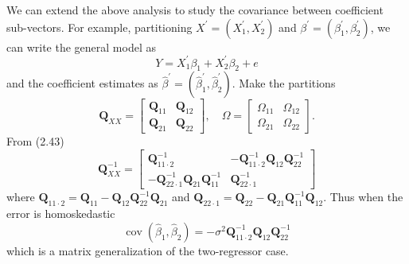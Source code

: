 \documentclass[10pt]{article}
\begin{document}
We can extend the above analysis to study the covariance between coefficient sub-vectors. For example, partitioning $X^{\prime}=\left(X_{1}^{\prime}, X_{2}^{\prime}\right)$ and $\beta^{\prime}=\left(\beta_{1}^{\prime}, \beta_{2}^{\prime}\right)$, we can write the general model as
$$
Y=X_{1}^{\prime} \beta_{1}+X_{2}^{\prime} \beta_{2}+e
$$
and the coefficient estimates as $\widehat{\beta}^{\prime}=\left(\widehat{\beta}_{1}^{\prime}, \widehat{\beta}_{2}^{\prime}\right)$. Make the partitions
$$
\boldsymbol{Q}_{X X}=\left[\begin{array}{ll}
\boldsymbol{Q}_{11} & \boldsymbol{Q}_{12} \\
\boldsymbol{Q}_{21} & \boldsymbol{Q}_{22}
\end{array}\right], \quad \Omega=\left[\begin{array}{ll}
\Omega_{11} & \Omega_{12} \\
\Omega_{21} & \Omega_{22}
\end{array}\right] .
$$
From (2.43)
$$
\boldsymbol{Q}_{X X}^{-1}=\left[\begin{array}{cc}
\boldsymbol{Q}_{11 \cdot 2}^{-1} & -\boldsymbol{Q}_{11 \cdot 2}^{-1} \boldsymbol{Q}_{12} \boldsymbol{Q}_{22}^{-1} \\
-\boldsymbol{Q}_{22 \cdot 1}^{-1} \boldsymbol{Q}_{21} \boldsymbol{Q}_{11}^{-1} & \boldsymbol{Q}_{22 \cdot 1}^{-1}
\end{array}\right]
$$
where $\boldsymbol{Q}_{11 \cdot 2}=\boldsymbol{Q}_{11}-\boldsymbol{Q}_{12} \boldsymbol{Q}_{22}^{-1} \boldsymbol{Q}_{21}$ and $\boldsymbol{Q}_{22 \cdot 1}=\boldsymbol{Q}_{22}-\boldsymbol{Q}_{21} \boldsymbol{Q}_{11}^{-1} \boldsymbol{Q}_{12}$. Thus when the error is homoskedastic
$$
\operatorname{cov}\left(\widehat{\beta}_{1}, \widehat{\beta}_{2}\right)=-\sigma^{2} \boldsymbol{Q}_{11 \cdot 2}^{-1} \boldsymbol{Q}_{12} \boldsymbol{Q}_{22}^{-1}
$$
which is a matrix generalization of the two-regressor case.
\end{document}
